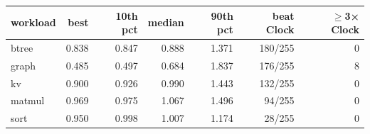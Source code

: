 \begin{tabular}{lrrrrrr}
\toprule
workload & best & 10th pct & median & 90th pct & beat Clock & $\geq$3× Clock \\
\midrule
btree & 0.838 & 0.847 & 0.888 & 1.371 & 180/255 & 0 \\
graph & 0.485 & 0.497 & 0.684 & 1.837 & 176/255 & 8 \\
kv & 0.900 & 0.926 & 0.990 & 1.443 & 132/255 & 0 \\
matmul & 0.969 & 0.975 & 1.067 & 1.496 & 94/255 & 0 \\
sort & 0.950 & 0.998 & 1.007 & 1.174 & 28/255 & 0 \\
\bottomrule
\end{tabular}
